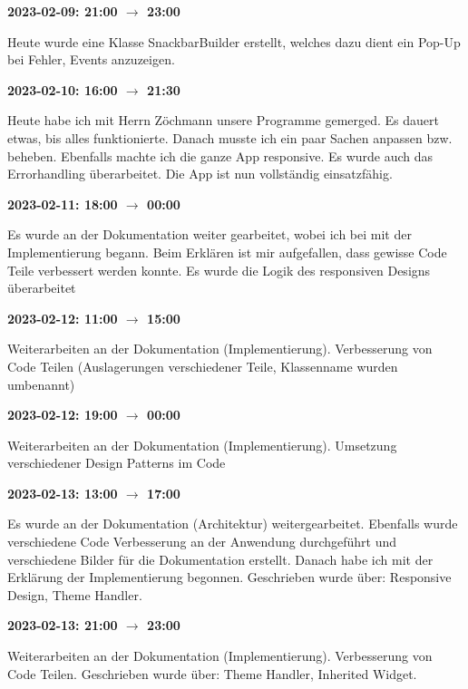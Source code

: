 \vspace{0.5cm} \textbf{2023-02-09: 21:00 $\rightarrow$ 23:00} 

Heute wurde eine Klasse
SnackbarBuilder erstellt, welches dazu dient ein Pop-Up bei Fehler, Events
anzuzeigen.

\vspace{0.5cm} \textbf{2023-02-10: 16:00 $\rightarrow$ 21:30} 

Heute habe ich mit Herrn
Zöchmann unsere Programme gemerged. Es dauert etwas, bis alles
funktionierte. Danach musste ich ein paar Sachen anpassen bzw. beheben.
Ebenfalls machte ich die ganze App responsive. Es wurde auch das
Errorhandling überarbeitet. Die App ist nun vollständig einsatzfähig.

\vspace{0.5cm} \textbf{2023-02-11: 18:00 $\rightarrow$ 00:00} 

Es wurde an der Dokumentation weiter gearbeitet, wobei ich bei mit der Implementierung
begann. Beim Erklären ist mir aufgefallen, dass gewisse Code Teile
verbessert werden konnte. Es wurde die Logik des responsiven Designs überarbeitet 

\vspace{0.5cm} \textbf{2023-02-12: 11:00 $\rightarrow$ 15:00} 

Weiterarbeiten an der Dokumentation (Implementierung). Verbesserung von Code Teilen (Auslagerungen verschiedener Teile, Klassenname wurden umbenannt) 

\vspace{0.5cm} \textbf{2023-02-12: 19:00 $\rightarrow$ 00:00} 

Weiterarbeiten an der
Dokumentation (Implementierung). Umsetzung verschiedener Design Patterns im Code

\vspace{0.5cm} \textbf{2023-02-13: 13:00 $\rightarrow$ 17:00} 

Es wurde an der Dokumentation (Architektur) weitergearbeitet. Ebenfalls wurde verschiedene Code Verbesserung an der Anwendung durchgef\"uhrt und verschiedene Bilder f\"ur die Dokumentation erstellt. Danach habe ich mit der Erkl\"arung der Implementierung begonnen. Geschrieben wurde über:  Responsive Design, Theme Handler.

\vspace{0.5cm} \textbf{2023-02-13: 21:00 $\rightarrow$ 23:00} 

Weiterarbeiten an der Dokumentation (Implementierung). Verbesserung von Code Teilen. Geschrieben wurde über: Theme Handler, Inherited Widget.

